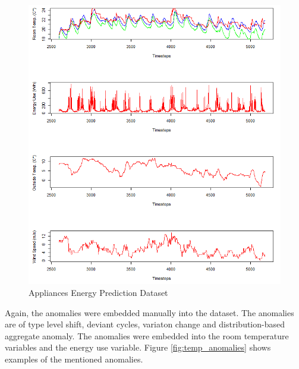 \begin{figure}[h]
	\centering
	\includegraphics[scale=0.6]{Figures/temp_dataset}
	\decoRule
	\caption[Temperature Dataset]{Appliances Energy Prediction Dataset \parencite{Own or UCI???}}
	\label{fig:temp_dataset}
\end{figure}

Again, the anomalies were embedded manually into the dataset. The anomalies are of type level shift, deviant cycles, variaton change and distribution-based aggregate anomaly. The anomalies were embedded into the room temperature variables and the energy use variable. Figure \ref{fig:temp_anomalies} shows examples of the mentioned anomalies.

